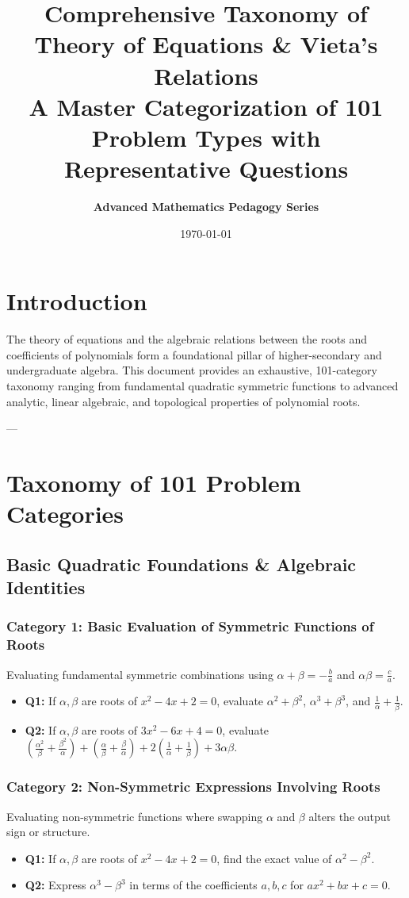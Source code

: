\documentclass[10pt,a4paper]{article}
\title{\textbf{Comprehensive Taxonomy of Theory of Equations \& Vieta's Relations}\\
\large A Master Categorization of 101 Problem Types with Representative Questions}
\author{\textbf{Advanced Mathematics Pedagogy Series}}
\date{\today}
\begin{document}
\maketitle

\tableofcontents
\newpage

\section{Introduction}
The theory of equations and the algebraic relations between the roots and coefficients of polynomials form a foundational pillar of higher-secondary and undergraduate algebra. This document provides an exhaustive, 101-category taxonomy ranging from fundamental quadratic symmetric functions to advanced analytic, linear algebraic, and topological properties of polynomial roots.

---

\section{Taxonomy of 101 Problem Categories}

\subsection{Basic Quadratic Foundations \& Algebraic Identities}

\subsubsection{Category 1: Basic Evaluation of Symmetric Functions of Roots}
Evaluating fundamental symmetric combinations using $\alpha + \beta = -\frac{b}{a}$ and $\alpha\beta = \frac{c}{a}$.
\begin{itemize}[leftmargin=*]
    \item \textbf{Q1:} If $\alpha, \beta$ are roots of $x^2 - 4x + 2 = 0$, evaluate $\alpha^2 + \beta^2$, $\alpha^3 + \beta^3$, and $\frac{1}{\alpha} + \frac{1}{\beta}$.
    \item \textbf{Q2:} If $\alpha, \beta$ are roots of $3x^2 - 6x + 4 = 0$, evaluate $\left(\frac{\alpha^2}{\beta} + \frac{\beta^2}{\alpha}\right) + \left(\frac{\alpha}{\beta} + \frac{\beta}{\alpha}\right) + 2\left(\frac{1}{\alpha} + \frac{1}{\beta}\right) + 3\alpha\beta$.
\end{itemize}

\subsubsection{Category 2: Non-Symmetric Expressions Involving Roots}
Evaluating non-symmetric functions where swapping $\alpha$ and $\beta$ alters the output sign or structure.
\begin{itemize}[leftmargin=*]
    \item \textbf{Q1:} If $\alpha, \beta$ are roots of $x^2 - 4x + 2 = 0$, find the exact value of $\alpha^2 - \beta^2$.
    \item \textbf{Q2:} Express $\alpha^3 - \beta^3$ in terms of the coefficients $a, b, c$ for $ax^2 + bx + c = 0$.
\end{itemize}
\end{document}
